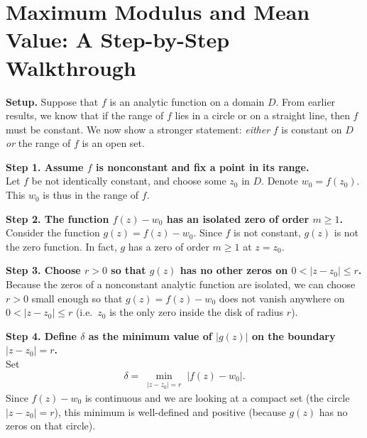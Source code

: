 \documentclass[12pt]{article}
\title{}
\author{Jerich Lee}
\date{\today}
\theoremstyle{definition} %
\theoremstyle{plain} %
\begin{document}
\maketitle


\section*{Maximum Modulus and Mean Value: A Step-by-Step Walkthrough}

\noindent
\textbf{Setup.} Suppose that $f$ is an analytic function on a domain $D$. From earlier results,
we know that if the range of $f$ lies in a circle or on a straight line, then $f$ must be constant.
We now show a stronger statement: \emph{either} $f$ is constant on $D$ \emph{or} the range of $f$
is an open set.

\medskip

\noindent
\textbf{Step 1. Assume $f$ is nonconstant and fix a point in its range.}\\
Let $f$ be not identically constant, and choose some $z_0$ in $D$. Denote $w_0 = f(z_0)$. This $w_0$
is thus in the range of $f$.

\medskip

\noindent
\textbf{Step 2. The function $f(z) - w_0$ has an isolated zero of order $m \ge 1$.}\\
Consider the function $g(z) = f(z) - w_0$. Since $f$ is not constant, $g(z)$ is not the zero function.
In fact, $g$ has a zero of order $m \ge 1$ at $z = z_0$. 

\medskip

\noindent
\textbf{Step 3. Choose $r>0$ so that $g(z)$ has no other zeros on $0 < |z - z_0| \le r$.}\\
Because the zeros of a nonconstant analytic function are isolated, we can choose $r > 0$ small enough
so that $g(z) = f(z) - w_0$ does not vanish anywhere on $0 < |z - z_0| \le r$ (i.e.\ $z_0$ is the only
zero inside the disk of radius $r$).

\medskip

\noindent
\textbf{Step 4. Define $\delta$ as the minimum value of $|g(z)|$ on the boundary $|z - z_0| = r$.}\\
Set
\[
  \delta = \min_{\substack{|z - z_0| = r}} \bigl|f(z) - w_0\bigr|.
\]
Since $f(z) - w_0$ is continuous and we are looking at a compact set (the circle $|z - z_0| = r$),
this minimum is well-defined and positive (because $g(z)$ has no zeros on that circle).

\medskip
\end{document}
